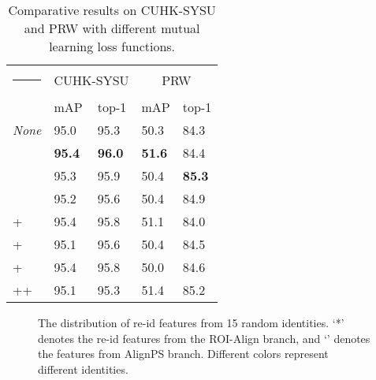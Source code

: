 \documentclass[journal]{IEEEtran}
\makeatletter
\newcommand{\thickhline}{\noalign {\ifnum 0=`}\fi \hrule height 1pt
    \futurelet \reserved@a \@xhline
}
\makeatother
\begin{document}
\begin{table}[t]
\small
\centering
\begin{tabular}{p{2.1cm}|p{1.1cm}<{\centering}p{1.1cm}<{\centering}|p{1.1cm}<{\centering}p{1.1cm}<{\centering}}
\hline\thickhline
\rowcolor{mygray} 
  & \multicolumn{2}{c|}{CUHK-SYSU} & \multicolumn{2}{c}{PRW}   \\ \cline{2-5} 
\rowcolor{mygray} 
\multirow{-2}{*}{Mutual Learning}  & mAP & top-1  & mAP  & top-1  \\  \hline \hline 
\textit{None}
   & 95.0     & 95.3       & 50.3   & 84.3   \\

   & \textbf{95.4}     & \textbf{96.0}      & \textbf{51.6}   & 84.4   \\
  & 95.3   &  95.9      & 50.4   & \textbf{85.3}    \\ 
  & 95.2   & 95.6       & 50.4   & 84.9  \\
+ & 95.4    & 95.8 & 51.1   & 84.0\\
+ & 95.1    & 95.6 & 50.4 & 84.5\\
+ & 95.4    & 95.8 & 50.0 & 84.6\\
++  & 95.1    & 95.3 & 51.4 & 85.2\\
\hline
\end{tabular}
\caption{Comparative results on CUHK-SYSU and PRW with different mutual learning loss functions. }
\label{tab:mls}
\end{table}


\begin{figure}[t]
\vspace{-6mm}
\centering
{}
\hfill
\centering
{}
 \caption{The distribution of re-id features from 15 random identities. `*' denotes the re-id features from the ROI-Align branch, and `' denotes the features from AlignPS branch. Different colors represent different identities. }
 \label{fig:tsne}
\end{figure}
\end{document}
